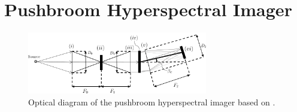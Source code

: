 \section{Pushbroom Hyperspectral Imager} \label{sec:hsi}
\begin{figure}[htbp]
  \centering
      \includegraphics[width=0.7\textwidth]{figs/optics.png}
  \caption{Optical diagram of the pushbroom hyperspectral imager based on \cite{Sigernes18}.}
	\label{fig:optics}
\end{figure}
